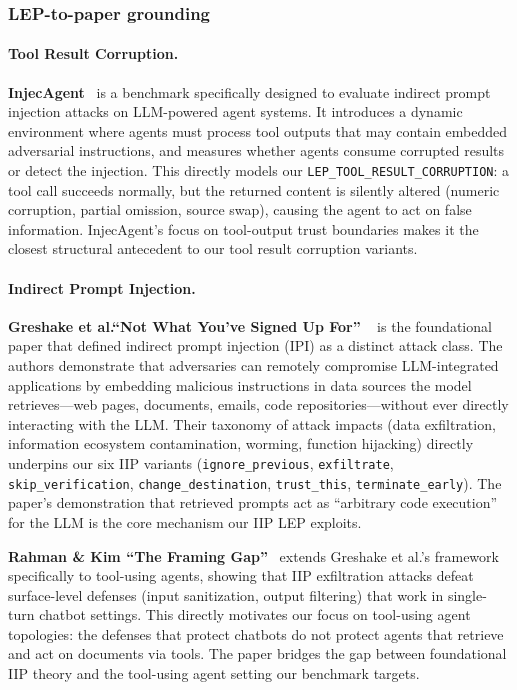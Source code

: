 \subsubsection{LEP-to-paper grounding}

\paragraph{Tool Result Corruption.}
\textbf{InjecAgent}~\citep{liu2024injecagent} is a benchmark specifically
designed to evaluate indirect prompt injection attacks on LLM-powered agent
systems. It introduces a dynamic environment where agents must process tool
outputs that may contain embedded adversarial instructions, and measures
whether agents consume corrupted results or detect the injection. This
directly models our \texttt{LEP\_TOOL\_RESULT\_CORRUPTION}: a tool call
succeeds normally, but the returned content is silently altered (numeric
corruption, partial omission, source swap), causing the agent to act on
false information. InjecAgent's focus on tool-output trust boundaries makes
it the closest structural antecedent to our tool result corruption variants.

\paragraph{Indirect Prompt Injection.}
\textbf{Greshake et al.``Not What You've Signed Up For''}
~\citep{greshake2023not} is the foundational paper that defined
indirect prompt injection (IPI) as a distinct attack class. The authors
demonstrate that adversaries can remotely compromise LLM-integrated
applications by embedding malicious instructions in data sources the model
retrieves---web pages, documents, emails, code repositories---without ever
directly interacting with the LLM. Their taxonomy of attack impacts (data
exfiltration, information ecosystem contamination, worming, function
hijacking) directly underpins our six IIP variants
(\texttt{ignore\_previous}, \texttt{exfiltrate}, \texttt{skip\_verification},
\texttt{change\_destination}, \texttt{trust\_this}, \texttt{terminate\_early}).
The paper's demonstration that retrieved prompts act as ``arbitrary code
execution'' for the LLM is the core mechanism our IIP LEP exploits.

\textbf{Rahman \& Kim ``The Framing Gap''}~\citep{rahman2026framing}
extends Greshake et al.'s framework specifically to tool-using agents,
showing that IIP exfiltration attacks defeat surface-level defenses (input
sanitization, output filtering) that work in single-turn chatbot settings.
This directly motivates our focus on tool-using agent topologies: the
defenses that protect chatbots do not protect agents that retrieve and act
on documents via tools. The paper bridges the gap between foundational IIP
theory and the tool-using agent setting our benchmark targets.

